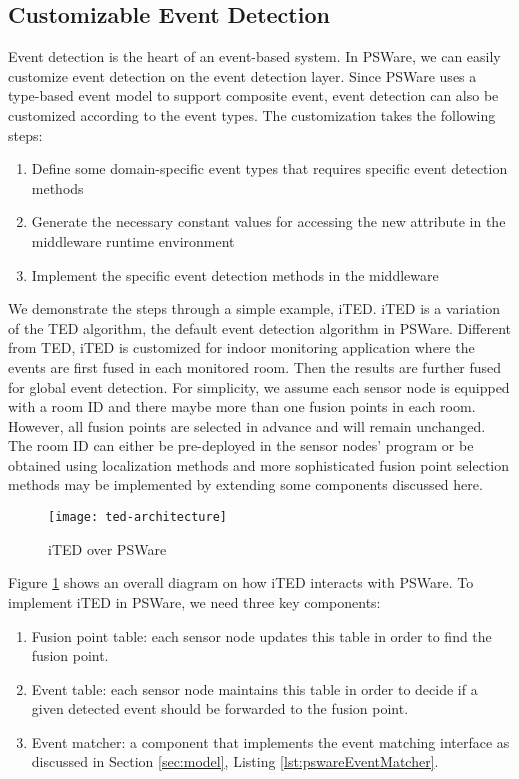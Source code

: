\subsection{Customizable Event Detection}
Event detection is the heart of an event-based system. In PSWare, we can easily customize event detection on the event detection layer. Since PSWare uses a type-based event model to support composite event, event detection can also be customized according to the event types. The customization takes the following steps:
\begin{enumerate}
\item Define some domain-specific event types that requires specific event detection methods
\item Generate the necessary constant values for accessing the new attribute in the middleware runtime environment
\item Implement the specific event detection methods in the middleware
\end{enumerate}

We demonstrate the steps through a simple example, iTED. iTED is a variation of the TED \cite{lai:ted} algorithm, the default event detection algorithm in PSWare. Different from TED, iTED is customized for indoor monitoring application where the events are first fused in each monitored room. Then the results are further fused for global event detection. For simplicity, we assume each sensor node is equipped with a room ID and there maybe more than one fusion points in each room. However, all fusion points are selected in advance and will remain unchanged. The room ID can either be pre-deployed in the sensor nodes' program or be obtained using localization methods and more sophisticated fusion point selection methods may be implemented by extending some components discussed here.

\begin{figure}
\centering
\texttt{[image: ted-architecture]}
\caption{iTED over PSWare}
\label{fig:ted-architecture}
\end{figure}

Figure \ref{fig:ted-architecture} shows an overall diagram on how iTED interacts with PSWare. To implement iTED in PSWare, we need three key components:
\begin{enumerate}
\item Fusion point table: each sensor node updates this table in order to find the fusion point.
\item Event table: each sensor node maintains this table in order to decide if a given detected event should be forwarded to the fusion point.
\item Event matcher: a component that implements the event matching interface as discussed in Section \ref{sec:model}, Listing \ref{lst:pswareEventMatcher}.
\end{enumerate}

